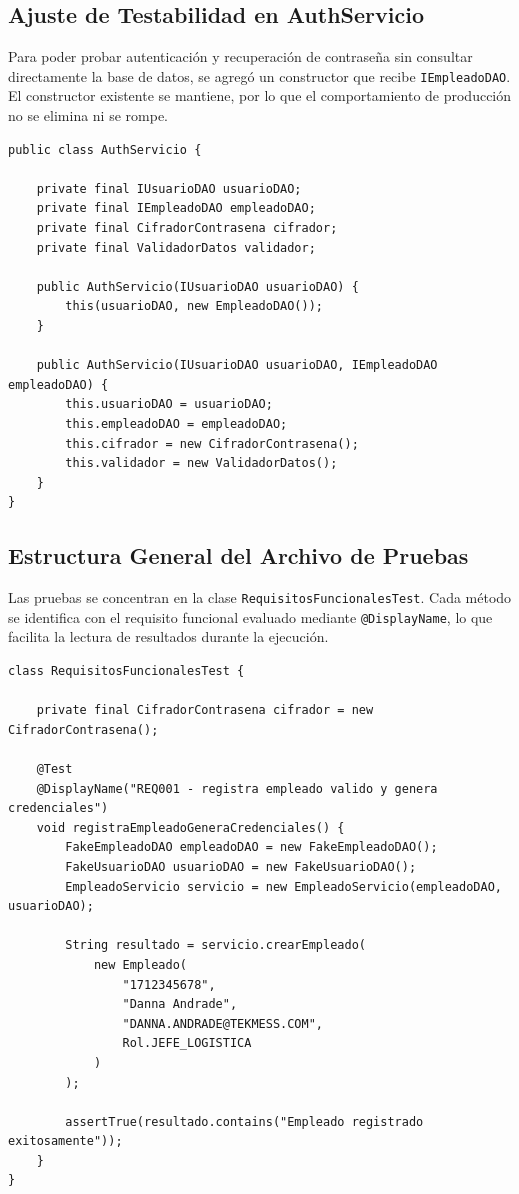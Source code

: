 \documentclass[12pt,a4paper]{article}
\begin{document}
\subsection{Ajuste de Testabilidad en AuthServicio}

Para poder probar autenticación y recuperación de contraseña sin consultar directamente la base de datos, se agregó un constructor que recibe \texttt{IEmpleadoDAO}. El constructor existente se mantiene, por lo que el comportamiento de producción no se elimina ni se rompe.

\begin{lstlisting}[style=javaStyle, caption={Constructor adicional para inyección de dependencias}]
public class AuthServicio {

    private final IUsuarioDAO usuarioDAO;
    private final IEmpleadoDAO empleadoDAO;
    private final CifradorContrasena cifrador;
    private final ValidadorDatos validador;

    public AuthServicio(IUsuarioDAO usuarioDAO) {
        this(usuarioDAO, new EmpleadoDAO());
    }

    public AuthServicio(IUsuarioDAO usuarioDAO, IEmpleadoDAO empleadoDAO) {
        this.usuarioDAO = usuarioDAO;
        this.empleadoDAO = empleadoDAO;
        this.cifrador = new CifradorContrasena();
        this.validador = new ValidadorDatos();
    }
}
\end{lstlisting}

\subsection{Estructura General del Archivo de Pruebas}

Las pruebas se concentran en la clase \texttt{RequisitosFuncionalesTest}. Cada método se identifica con el requisito funcional evaluado mediante \texttt{@DisplayName}, lo que facilita la lectura de resultados durante la ejecución.

\begin{lstlisting}[style=javaStyle, caption={Estructura base de la clase de pruebas}]
class RequisitosFuncionalesTest {

    private final CifradorContrasena cifrador = new CifradorContrasena();

    @Test
    @DisplayName("REQ001 - registra empleado valido y genera credenciales")
    void registraEmpleadoGeneraCredenciales() {
        FakeEmpleadoDAO empleadoDAO = new FakeEmpleadoDAO();
        FakeUsuarioDAO usuarioDAO = new FakeUsuarioDAO();
        EmpleadoServicio servicio = new EmpleadoServicio(empleadoDAO, usuarioDAO);

        String resultado = servicio.crearEmpleado(
            new Empleado(
                "1712345678",
                "Danna Andrade",
                "DANNA.ANDRADE@TEKMESS.COM",
                Rol.JEFE_LOGISTICA
            )
        );

        assertTrue(resultado.contains("Empleado registrado exitosamente"));
    }
}
\end{lstlisting}
\end{document}
